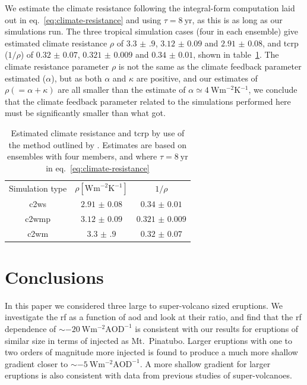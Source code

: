 \documentclass{ametsocV6.1}
\newcommand{\iso}[1][i]{{#1}njected \ce{SO2}}
\begin{document}
We estimate the climate resistance following the integral-form computation laid out in
eq.~\ref{eq:climate-resistance} and using \(\tau =\SI{8}{\mathrm{yr}}\), as this is as
long as our simulations run. The three tropical simulation cases (four in each ensemble)
give estimated climate resistance \(\rho \) of \(\num{3.3(9)}\), \(\num{3.12(9)}\) and
\(\num{2.91(8)}\), and \gls{tcrp} (\(1/\rho\)) of \(\num{0.32(7)}\), \(\num{0.321(9)}\)
and \(\num{0.34(1)}\), shown in table~\ref{tab:trcp}. The climate resistance parameter
\(\rho\) is not the same as the climate feedback parameter \citet{jones2005} estimated
(\(\alpha\)), but as both \(\alpha \) and \(\kappa \) are positive, and our estimates of
\(\rho (=\alpha +\kappa) \) are all smaller than the \citet{jones2005} estimate of
\(\alpha \simeq \SI{4}{\watt\metre^{-2}\kelvin^{-1}}\), we conclude that the climate
feedback parameter related to the simulations performed here must be significantly
smaller than what \citet{jones2005} got.

\begin{table}
  \centering

  \caption{Estimated climate resistance and \gls{tcrp} by use of the method outlined by
    \citet{merlis2014}. Estimates are based on ensembles with four members, and where \(\tau
    =\SI{8}{\mathrm{yr}}\) in eq.~\ref{eq:climate-resistance}}\label{tab:trcp}%
  \begin{tabular}{ccc}
    Simulation type & \(\rho [\si{\watt\metre^{-2}\kelvin^{-1}}]\) & \(1/\rho\)         \\
    \gls{c2ws}      & \(\num{2.91(8)}\)                            & \(\num{0.34(1)}\)  \\
    \gls{c2wmp}     & \(\num{3.12(9)}\)                            & \(\num{0.321(9)}\) \\
    \gls{c2wm}      & \(\num{3.3(9)}\)                             & \(\num{0.32(7)}\)  \\
  \end{tabular}
\end{table}

\section{Conclusions}\label{sec:conclusions}

In this paper we considered three large to super-volcano sized eruptions. We investigate
the \gls{rf} as a function of \gls{aod} and look at their ratio, and find that the
\gls{rf} dependence of \(\sim\SI{-20}{\watt\metre^{-2}\mathrm{AOD}^{-1}}\) is consistent
with our results for eruptions of similar size in terms of \iso{} as Mt.\ Pinatubo.
Larger eruptions with one to two orders of magnitude more \iso{} is found to produce a
much more shallow gradient closer to \(\sim
\SI{-5}{\watt\metre^{-2}\mathrm{AOD}^{-1}}\). A more shallow gradient for larger
eruptions is also consistent with data from previous studies of super-volcanoes.
\end{document}
